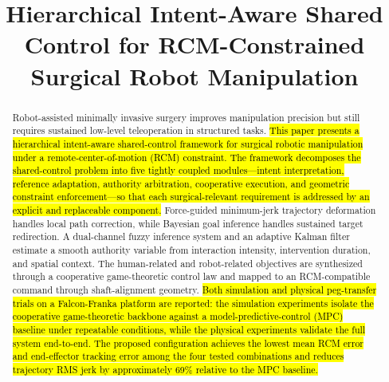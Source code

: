 \documentclass[conference]{IEEEtran}
\begin{document}
\title{Hierarchical Intent-Aware Shared Control for RCM-Constrained Surgical Robot Manipulation}

\author{
}

\maketitle

\begin{abstract}
Robot-assisted minimally invasive surgery improves manipulation precision but still requires sustained low-level teleoperation in structured tasks. \hl{This paper presents a hierarchical intent-aware shared-control framework for surgical robotic manipulation under a remote-center-of-motion (RCM) constraint. The framework decomposes the shared-control problem into five tightly coupled modules---intent interpretation, reference adaptation, authority arbitration, cooperative execution, and geometric constraint enforcement---so that each surgical-relevant requirement is addressed by an explicit and replaceable component.} Force-guided minimum-jerk trajectory deformation handles local path correction, while Bayesian goal inference handles sustained target redirection. A dual-channel fuzzy inference system and an adaptive Kalman filter estimate a smooth authority variable from interaction intensity, intervention duration, and spatial context. The human-related and robot-related objectives are synthesized through a cooperative game-theoretic control law and mapped to an RCM-compatible command through shaft-alignment geometry. \hl{Both simulation and physical peg-transfer trials on a Falcon-Franka platform are reported: the simulation experiments isolate the cooperative game-theoretic backbone against a model-predictive-control (MPC) baseline under repeatable conditions, while the physical experiments validate the full system end-to-end. The proposed configuration achieves the lowest mean RCM error and end-effector tracking error among the four tested combinations and reduces trajectory RMS jerk by approximately 69\% relative to the MPC baseline.}
\end{abstract}
\end{document}
